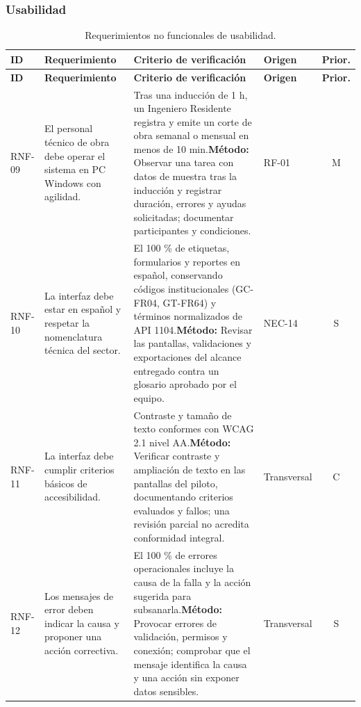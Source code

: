 \documentclass[12pt,letterpaper]{article}
\begin{document}
\subsubsection{Usabilidad}

{\small
\begin{longtable}{@{}L{1.8cm} L{4.65cm} L{4.75cm} L{2.1cm} c@{}}
\caption{Requerimientos no funcionales de usabilidad.}\\
\toprule{}
\textbf{ID} & \textbf{Requerimiento} & \textbf{Criterio de verificación} & \textbf{Origen} & \textbf{Prior.} \\
\midrule
\endfirsthead
\toprule{}
\textbf{ID} & \textbf{Requerimiento} & \textbf{Criterio de verificación} & \textbf{Origen} & \textbf{Prior.} \\
\midrule
\endhead
\bottomrule
\endfoot
RNF-09 & El personal técnico de obra debe operar el sistema en PC Windows con agilidad. & Tras una inducción de 1 h, un Ingeniero Residente registra y emite un corte de obra semanal o mensual en menos de 10 min.\newline \textbf{Método:} Observar una tarea con datos de muestra tras la inducción y registrar duración, errores y ayudas solicitadas; documentar participantes y condiciones. & RF-01 & M \\
RNF-10 & La interfaz debe estar en español y respetar la nomenclatura técnica del sector. & El 100 \% de etiquetas, formularios y reportes en español, conservando códigos institucionales (GC-FR04, GT-FR64) y términos normalizados de API 1104.\newline \textbf{Método:} Revisar las pantallas, validaciones y exportaciones del alcance entregado contra un glosario aprobado por el equipo. & NEC-14 & S \\
RNF-11 & La interfaz debe cumplir criterios básicos de accesibilidad. & Contraste y tamaño de texto conformes con WCAG 2.1 nivel AA.\newline \textbf{Método:} Verificar contraste y ampliación de texto en las pantallas del piloto, documentando criterios evaluados y fallos; una revisión parcial no acredita conformidad integral. & Transversal & C \\
RNF-12 & Los mensajes de error deben indicar la causa y proponer una acción correctiva. & El 100 \% de errores operacionales incluye la causa de la falla y la acción sugerida para subsanarla.\newline \textbf{Método:} Provocar errores de validación, permisos y conexión; comprobar que el mensaje identifica la causa y una acción sin exponer datos sensibles. & Transversal & S \\
\end{longtable}
}
\end{document}
